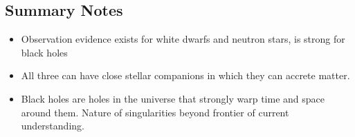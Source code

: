 \subsection{Summary Notes}
\begin{itemize}
\item Observation evidence exists for white dwarfs and neutron stars, is strong for black holes
\item All three can have close stellar companions in which they can accrete matter.
\item Black holes are holes in the universe that strongly warp time and space around them. Nature of singularities beyond frontier of current understanding.
\end{itemize}
